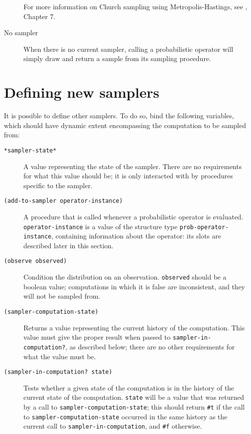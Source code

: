 \documentclass{article}
\begin{document}
\begin{description}
  For more information on Church sampling using Metropolis-Hastings,
  see \cite{goodman_probabilistic_????}, Chapter 7.

\item[No sampler] \hfill

  When there is no current sampler, calling a probabilistic operator
  will simply draw and return a sample from its sampling procedure.
  
\end{description}

\section{Defining new samplers}

It is possible to define other samplers. To do so, bind the following
variables, which should have dynamic extent encompassing the
computation to be sampled from:

\begin{description}
\item[\texttt{*sampler-state*}] \hfill

  A value representing the state of the sampler. There are no
  requirements for what this value should be; it is only interacted
  with by procedures specific to the sampler.
  
\item[\texttt{(add-to-sampler operator-instance)}] \hfill

  A procedure that is called whenever a probabilistic operator is
  evaluated. \texttt{operator-instance} is a value of the structure
  type \texttt{prob-operator-instance}, containing information about
  the operator: its slots are described later in this section.
  
\item[\texttt{(observe observed)}] \hfill

  Condition the distribution on an observation. \texttt{observed}
  should be a boolean value; computations in which it is false are
  inconsistent, and they will not be sampled from.
    
\item[\texttt{(sampler-computation-state)}] \hfill

  Returns a value representing the current history of the
  computation. This value must give the proper result when passed to
  \texttt{sampler-in-computation?}, as described below; there are no
  other requirements for what the value must be.
  
\item[\texttt{(sampler-in-computation? state)}] \hfill

  Tests whether a given state of the computation is in the history of
  the current state of the computation. \texttt{state} will be a value
  that was returned by a call to \texttt{sampler-computation-state};
  this should return \texttt{\#t} if the call to
  \texttt{sampler-computation-state} occurred in the same history as
  the current call to \texttt{sampler-in-computation}, and \texttt{\#f}
  otherwise.
  
\end{description}
\end{document}
